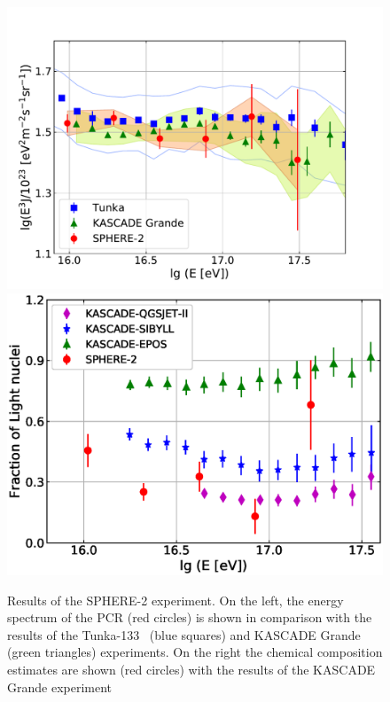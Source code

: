 \documentclass[a4paper,11pt]{article}
\begin{document}
\begin{figure}[t]
\centering %
\hfill
\includegraphics[height=.25\textheight]{sphere2spectrum.pdf}
\hfill
\includegraphics[height=.25\textheight]{sphere2composition.eps}
\hfill
\caption{Results of the SPHERE-2 experiment. On the left, the energy spectrum of the PCR (red circles) is shown in comparison with the results of the Tunka-133~\cite{Tunka2020} (blue squares) and KASCADE Grande~\cite{Ape12} (green triangles) experiments. On the right the chemical composition estimates are shown (red circles) with the results of the KASCADE Grande experiment~\cite{Ape13}}
\label{fig:Sphere_results}
\end{figure}
\end{document}
